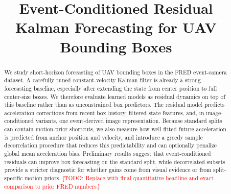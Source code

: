 \documentclass[10pt]{article}
\title{Event-Conditioned Residual Kalman Forecasting for UAV Bounding Boxes}
\author{
  \todo{Author names and affiliations}
}
\date{}
\newcommand{\todo}[1]{\textcolor{red}{[TODO: #1]}}
\begin{document}
\maketitle

\begin{abstract}
We study short-horizon forecasting of UAV bounding boxes in the FRED event-camera dataset. A carefully tuned constant-velocity Kalman filter is already a strong forecasting baseline, especially after extending the state from center position to full center-size boxes. We therefore evaluate learned models as residual dynamics on top of this baseline rather than as unconstrained box predictors. The residual model predicts acceleration corrections from recent box history, filtered state features, and, in image-conditioned variants, one event-derived image representation. Because standard splits can contain motion-prior shortcuts, we also measure how well fitted future acceleration is predicted from anchor position and velocity, and introduce a greedy sample decorrelation procedure that reduces this predictability and can optionally penalize global mean acceleration bias. Preliminary results suggest that event-conditioned residuals can improve box forecasting on the standard split, while decorrelated subsets provide a stricter diagnostic for whether gains come from visual evidence or from split-specific motion priors. \todo{Replace with final quantitative headline and exact comparison to prior FRED numbers.}
\end{abstract}











\end{document}
